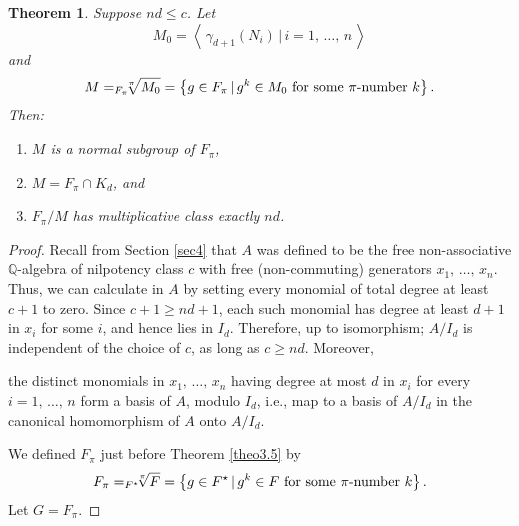 \documentclass[mathscr]{amsart}
\theoremstyle{theorem}
\newtheorem{theorem}{Theorem}[section]
\theoremstyle{definition}
\numberwithin{equation}{section}
\def \({\left(}
\def \){\right)}
\begin{document}
\begin{theorem}\label{theo5.6-3-28-07}
Suppose $nd\leq c$.  Let
$$M_0=\left\langle
\,\gamma_{d+1}\(N_i\)\,|\,i=1,\,\dots,\,n\,\right\rangle
$$
and
$$
M=_{F_\pi}\hspace*{-0.2cm}\sqrt[\pi]{M_0}=\left\{g\in
F_\pi\,|\,g^k\in M_0\text{ for some }\pi\text{-number }k\right\}.
$$
Then:
\begin{enumerate}
\item[(a)] $M$ is a normal subgroup of $F_\pi$,
\item[(b)] $M=F_\pi\cap K_d$, and
\item[(c)] $F_\pi/M$ has multiplicative class exactly $nd$.
\end{enumerate}
\end{theorem}

\begin{proof}
Recall from Section \ref{sec4} that $A$ was defined to be the free
non-associative $\mathbb{Q}$-algebra of nilpotency class $c$ with
free (non-commuting) generators $x_1,\,\dots,\,x_n$.  Thus, we can
calculate in $A$ by setting every monomial of total degree at least
$c+1$ to zero.  Since $c+1\geq nd+1$, each such monomial has degree
at least $d+1$ in $x_i$ for some $i$, and hence lies in $I_d$.
Therefore, up to isomorphism; $A/I_d$ is independent of the choice
of $c$, as long as $c\geq nd$.  Moreover,

\bigskip
\qquad the distinct monomials in $x_1,\,\dots,\,x_n$ having degree
at most $d$ in $x_i$ for every $i=1,\,\dots,\,n$ form a basis of
$A$, modulo $I_d$,  i.e., map to a basis of $A/I_d$ in the canonical
homomorphism of $A$ onto $A/I_d$. \vspace{-1.45cm}
\begin{equation}\label{eq5.9-3-28-07}
\end{equation}
\bigskip



\bigskip We defined $F_\pi$ just before Theorem \ref{theo3.5} by
\begin{equation}\label{eq5.10-3-28-07}
F_\pi=_{F^\star}\hspace*{-0.2cm}\sqrt[\pi]F=\left\{g\in
F^\star\,|\,g^k\in F\text{ for some }\pi\text{-number }k\right\}.
\end{equation}
Let $G=F_\pi$.


\end{proof}
\end{document}
